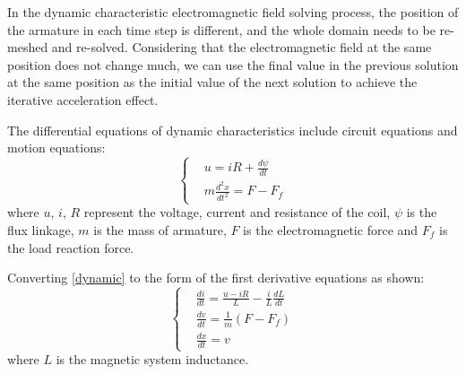 \documentclass[journal,transmag]{IEEEtran}
\begin{document}
In the dynamic characteristic electromagnetic field solving process, the position of the armature in each time step is different, and the whole domain needs to be re-meshed and re-solved. Considering that the electromagnetic field at the same position does not change much, we can use the final value in the previous solution at the same position as the initial value of the next solution to achieve the iterative acceleration effect.

The differential equations of dynamic characteristics include circuit equations and motion equations:
\begin{equation}
\left\{ 
\begin{aligned}
&u = iR + \frac{{d\psi }}{{dt}}\\
&m\frac{{{d^2}x}}{{d{t^2}}} = F - {F_f}
\end{aligned} 
\right.
\label{dynamic}
\end{equation}
where $u$, $i$, $R$ represent the voltage, current and resistance of the coil, $\psi$ is the flux linkage, $m$ is the mass of armature, $F$ is the electromagnetic force and $F_f$ is the load reaction force.

Converting \eqref{dynamic} to the form of the first derivative equations as shown:
\begin{equation}
\left\{
\begin{aligned}
&\frac{{di}}{{dt}} = \frac{{u - iR}}{L} - \frac{i}{L}\frac{{dL}}{{dt}}\\
&\frac{{dv}}{{dt}} = \frac{1}{m}(F - {F_f})\\
&\frac{{dx}}{{dt}} = v
\end{aligned}
\right.
\label{equ:dif}
\end{equation}
where $L$ is the magnetic system inductance.
\end{document}
